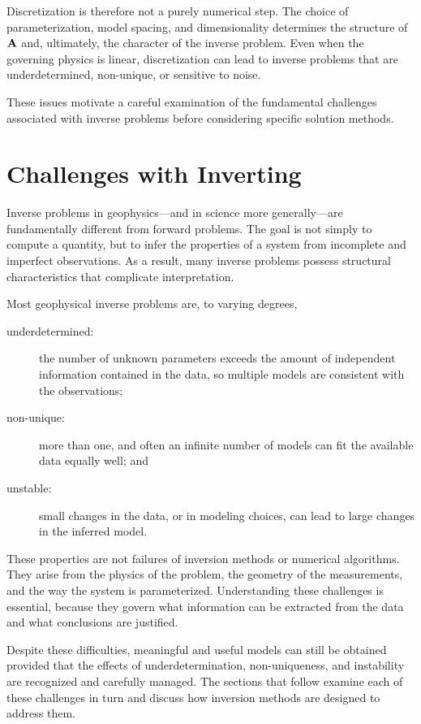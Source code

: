 Discretization is therefore not a purely numerical step. The choice of parameterization, model spacing, and dimensionality determines the structure of $\vb{A}$ and, ultimately, the character of the inverse problem. Even when the governing physics is linear, discretization can lead to inverse problems that are underdetermined, non-unique, or sensitive to noise.

These issues motivate a careful examination of the fundamental challenges associated with inverse problems before considering specific solution methods.

\section{Challenges with Inverting}
Inverse problems in geophysics---and in science more generally---are fundamentally different from forward problems. The goal is not simply to compute a quantity, but to infer the properties of a system from incomplete and imperfect observations. As a result, many inverse problems possess structural characteristics that complicate interpretation.

Most geophysical inverse problems are, to varying degrees,
\begin{description}
    \item[underdetermined:] the number of unknown parameters exceeds the amount of independent information contained in the data, so multiple models are consistent with the observations;
    \item[non-unique:] more than one, and often an infinite number of models can fit the available data equally well; and
    \item[unstable:] small changes in the data, or in modeling choices, can lead to large changes in the inferred model.
\end{description}

These properties are not failures of inversion methods or numerical algorithms. They arise from the physics of the problem, the geometry of the measurements, and the way the system is parameterized. Understanding these challenges is essential, because they govern what information can be extracted from the data and what conclusions are justified.

Despite these difficulties, meaningful and useful models can still be obtained provided that the effects of underdetermination, non-uniqueness, and instability are recognized and carefully managed. The sections that follow examine each of these challenges in turn and discuss how inversion methods are designed to address them.

